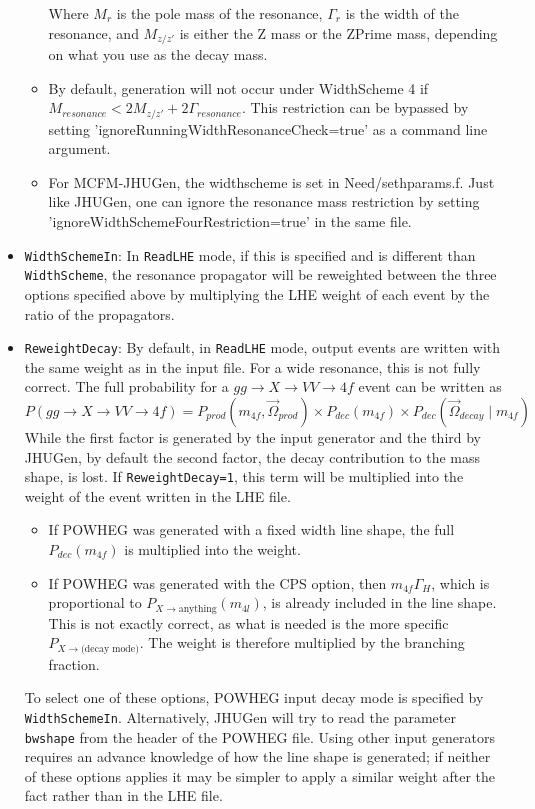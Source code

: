 \documentclass[aps,superscriptaddress,nofootinbib]{revtex4}
\begin{document}
\begin{itemize}
\begin{itemize}
  Where $M_{r}$ is the pole mass of the resonance, $\Gamma_{r}$ is the width of the resonance, and $M_{z/z'}$ is either the Z mass or the ZPrime mass, depending on what you use as the decay mass.
  \item By default, generation will not occur under WidthScheme 4 if $M_{resonance} < 2 M_{z/z'} + 2\Gamma_{resonance}$. This restriction can be bypassed by setting 'ignoreRunningWidthResonanceCheck=true' as a command line argument.
  \item For MCFM-JHUGen, the widthscheme is set in Need/sethparams.f. Just like JHUGen, one can ignore the resonance mass restriction by setting 'ignoreWidthSchemeFourRestriction=true' in the same file.
\end{itemize}
\item \verb|WidthSchemeIn|: In \verb|ReadLHE| mode, if this is specified and is different than \verb|WidthScheme|, the resonance propagator will be reweighted between the three options specified above by multiplying the LHE weight of each event by the ratio of the propagators.
\item \verb|ReweightDecay|: By default, in \verb|ReadLHE| mode, output events are written with the same weight as in the input file.  For a wide resonance, this is not fully correct.  The full probability for a $gg\to X\to VV\to 4f$ event can be written as
\[
P(gg\to X\to VV\to 4f)=P_{prod}(m_{4f},\vec{\Omega}_{prod})\times P_{dec}(m_{4f})\times P_{dec}(\vec{\Omega}_{decay}\mid m_{4f})
\]
While the first factor is generated by the input generator and the third by JHUGen, by default the second factor, the decay contribution to the mass shape, is lost.  If \verb|ReweightDecay=1|, this term will be multiplied into the weight of the event written in the LHE file.
\begin{itemize}
\item If POWHEG was generated with a fixed width line shape, the full $P_{dec}(m_{4f})$ is multiplied into the weight.
\item If POWHEG was generated with the CPS option, then $m_{4f}\Gamma_H$, which is proportional to $P_{X\to \text{anything}}(m_{4l})$, is already included in the line shape.  This is not exactly correct, as what is needed is the more specific $P_{X\to\text{(decay mode)}}$.  The weight is therefore multiplied by the branching fraction.
\end{itemize}
To select one of these options, POWHEG input decay mode is specified by \verb|WidthSchemeIn|.  Alternatively, JHUGen will try to read the parameter \verb|bwshape| from the header of the POWHEG file.  Using other input generators requires an advance knowledge of how the line shape is generated; if neither of these options applies it may be simpler to apply a similar weight after the fact rather than in the LHE file.

\end{itemize}
\end{document}
